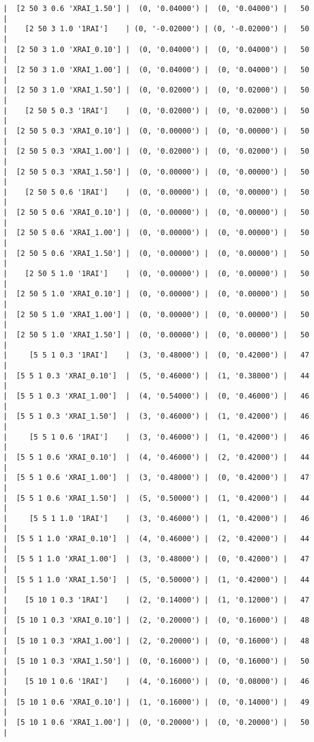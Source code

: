 \documentclass{article}
\begin{document}
\begin{verbatim}
|  [2 50 3 0.6 'XRAI_1.50'] |  (0, '0.04000') |  (0, '0.04000') |   50  |
|    [2 50 3 1.0 '1RAI']    | (0, '-0.02000') | (0, '-0.02000') |   50  |
|  [2 50 3 1.0 'XRAI_0.10'] |  (0, '0.04000') |  (0, '0.04000') |   50  |
|  [2 50 3 1.0 'XRAI_1.00'] |  (0, '0.04000') |  (0, '0.04000') |   50  |
|  [2 50 3 1.0 'XRAI_1.50'] |  (0, '0.02000') |  (0, '0.02000') |   50  |
|    [2 50 5 0.3 '1RAI']    |  (0, '0.02000') |  (0, '0.02000') |   50  |
|  [2 50 5 0.3 'XRAI_0.10'] |  (0, '0.00000') |  (0, '0.00000') |   50  |
|  [2 50 5 0.3 'XRAI_1.00'] |  (0, '0.02000') |  (0, '0.02000') |   50  |
|  [2 50 5 0.3 'XRAI_1.50'] |  (0, '0.00000') |  (0, '0.00000') |   50  |
|    [2 50 5 0.6 '1RAI']    |  (0, '0.00000') |  (0, '0.00000') |   50  |
|  [2 50 5 0.6 'XRAI_0.10'] |  (0, '0.00000') |  (0, '0.00000') |   50  |
|  [2 50 5 0.6 'XRAI_1.00'] |  (0, '0.00000') |  (0, '0.00000') |   50  |
|  [2 50 5 0.6 'XRAI_1.50'] |  (0, '0.00000') |  (0, '0.00000') |   50  |
|    [2 50 5 1.0 '1RAI']    |  (0, '0.00000') |  (0, '0.00000') |   50  |
|  [2 50 5 1.0 'XRAI_0.10'] |  (0, '0.00000') |  (0, '0.00000') |   50  |
|  [2 50 5 1.0 'XRAI_1.00'] |  (0, '0.00000') |  (0, '0.00000') |   50  |
|  [2 50 5 1.0 'XRAI_1.50'] |  (0, '0.00000') |  (0, '0.00000') |   50  |
|     [5 5 1 0.3 '1RAI']    |  (3, '0.48000') |  (0, '0.42000') |   47  |
|  [5 5 1 0.3 'XRAI_0.10']  |  (5, '0.46000') |  (1, '0.38000') |   44  |
|  [5 5 1 0.3 'XRAI_1.00']  |  (4, '0.54000') |  (0, '0.46000') |   46  |
|  [5 5 1 0.3 'XRAI_1.50']  |  (3, '0.46000') |  (1, '0.42000') |   46  |
|     [5 5 1 0.6 '1RAI']    |  (3, '0.46000') |  (1, '0.42000') |   46  |
|  [5 5 1 0.6 'XRAI_0.10']  |  (4, '0.46000') |  (2, '0.42000') |   44  |
|  [5 5 1 0.6 'XRAI_1.00']  |  (3, '0.48000') |  (0, '0.42000') |   47  |
|  [5 5 1 0.6 'XRAI_1.50']  |  (5, '0.50000') |  (1, '0.42000') |   44  |
|     [5 5 1 1.0 '1RAI']    |  (3, '0.46000') |  (1, '0.42000') |   46  |
|  [5 5 1 1.0 'XRAI_0.10']  |  (4, '0.46000') |  (2, '0.42000') |   44  |
|  [5 5 1 1.0 'XRAI_1.00']  |  (3, '0.48000') |  (0, '0.42000') |   47  |
|  [5 5 1 1.0 'XRAI_1.50']  |  (5, '0.50000') |  (1, '0.42000') |   44  |
|    [5 10 1 0.3 '1RAI']    |  (2, '0.14000') |  (1, '0.12000') |   47  |
|  [5 10 1 0.3 'XRAI_0.10'] |  (2, '0.20000') |  (0, '0.16000') |   48  |
|  [5 10 1 0.3 'XRAI_1.00'] |  (2, '0.20000') |  (0, '0.16000') |   48  |
|  [5 10 1 0.3 'XRAI_1.50'] |  (0, '0.16000') |  (0, '0.16000') |   50  |
|    [5 10 1 0.6 '1RAI']    |  (4, '0.16000') |  (0, '0.08000') |   46  |
|  [5 10 1 0.6 'XRAI_0.10'] |  (1, '0.16000') |  (0, '0.14000') |   49  |
|  [5 10 1 0.6 'XRAI_1.00'] |  (0, '0.20000') |  (0, '0.20000') |   50  |

\end{verbatim}
\end{document}
